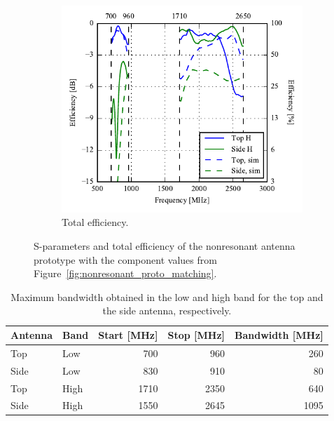 \begin{figure}[htbp]
\begin{subfigure}{0.49\linewidth}
    \includegraphics{img/tech_sol/nonresonant/prototype/eff_comp.pdf}
        \caption{Total efficiency.}
    \end{subfigure}
    \caption{S-parameters and total efficiency of the nonresonant antenna prototype with the component values from Figure~\ref{fig:nonresonant_proto_matching}.}
    \label{fig:nonresonant_proto_sparam_eff}
\end{figure}

   \begin{table}
      \centering
      \begin{tabular}{|l|l|r|r|r|}
        \hline
        Antenna & Band & Start [MHz] & Stop [MHz] & Bandwidth [MHz] \\
        \hline
        Top     & Low  & 700        & 960       & 260 \\
        Side    & Low  & 830         & 910        & 80 \\
        \hline
        Top     & High & 1710        & 2350       & 640 \\
        Side    & High & 1550        & 2645       & 1095 \\
        \hline
      \end{tabular}
      \caption{Maximum bandwidth obtained in the low and high band for the top and the side antenna, respectively.}
      \label{tab:bw_sol3_proto}
    \end{table}

